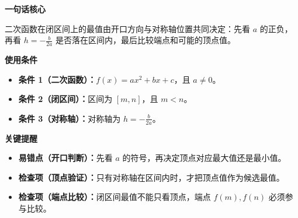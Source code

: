 \begin{summarybox}
	\textbf{\textcolor{CSummary}{一句话核心}}

	二次函数在闭区间上的最值由开口方向与对称轴位置共同决定：先看 $a$ 的正负，再看 $h=-\frac{b}{2a}$ 是否落在区间内，最后比较端点和可能的顶点值。

	\medskip
	\textbf{\textcolor{CSummary}{使用条件}}
	\begin{itemize}[leftmargin=*, itemsep=0.5em, topsep=0.4em]
		\item \textbf{条件 1（二次函数）：}$f(x)=ax^2+bx+c$，且 $a\neq0$。
		\item \textbf{条件 2（闭区间）：}区间为 $[m,n]$，且 $m<n$。
		\item \textbf{条件 3（对称轴）：}对称轴为 $h=-\frac{b}{2a}$。
	\end{itemize}

	\medskip
	\textbf{\textcolor{CSummary}{关键提醒}}
	\begin{itemize}[leftmargin=*, itemsep=0.5em, topsep=0.4em]
		\item \textbf{易错点（开口判断）：}先看 $a$ 的符号，再决定顶点对应最大值还是最小值。
		\item \textbf{检查项（顶点验证）：}只有对称轴在区间内时，才把顶点值作为候选最值。
		\item \textbf{检查项（端点比较）：}闭区间最值不能只看顶点，端点 $f(m),f(n)$ 必须参与比较。
	\end{itemize}
\end{summarybox}